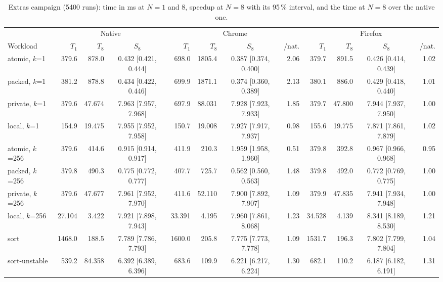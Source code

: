 \begin{table}[htbp]
\caption{Extras campaign (5400 runs): time in ms at $N=1$ and 8, speedup at $N=8$ with its 95\,\% interval, and the time at $N=8$ over the native one.}\label{tab:extras}
\centering\scriptsize
\begin{tabular}{lrrcrrcrrrcr}
\toprule
 & \multicolumn{3}{c}{Native} & \multicolumn{4}{c}{Chrome} & \multicolumn{4}{c}{Firefox} \\
Workload & $T_1$ & $T_8$ & $S_8$ & $T_1$ & $T_8$ & $S_8$ & /nat. & $T_1$ & $T_8$ & $S_8$ & /nat. \\
\midrule
atomic, $k$=1 & 379.6 & 878.0 & 0.432 [0.421, 0.444] & 698.0 & 1805.4 & 0.387 [0.374, 0.400] & 2.06 & 379.7 & 891.5 & 0.426 [0.414, 0.439] & 1.02 \\
packed, $k$=1 & 381.2 & 878.8 & 0.434 [0.422, 0.446] & 699.9 & 1871.1 & 0.374 [0.360, 0.389] & 2.13 & 380.1 & 886.0 & 0.429 [0.418, 0.440] & 1.01 \\
private, $k$=1 & 379.6 & 47.674 & 7.963 [7.957, 7.968] & 697.9 & 88.031 & 7.928 [7.923, 7.933] & 1.85 & 379.7 & 47.800 & 7.944 [7.937, 7.950] & 1.00 \\
local, $k$=1 & 154.9 & 19.475 & 7.955 [7.952, 7.958] & 150.7 & 19.008 & 7.927 [7.917, 7.937] & 0.98 & 155.6 & 19.775 & 7.871 [7.861, 7.879] & 1.02 \\
\midrule
atomic, $k$=256 & 379.6 & 414.6 & 0.915 [0.914, 0.917] & 411.9 & 210.3 & 1.959 [1.958, 1.960] & 0.51 & 379.8 & 392.8 & 0.967 [0.966, 0.968] & 0.95 \\
packed, $k$=256 & 379.8 & 490.3 & 0.775 [0.772, 0.777] & 407.7 & 725.7 & 0.562 [0.560, 0.563] & 1.48 & 379.8 & 492.0 & 0.772 [0.769, 0.775] & 1.00 \\
private, $k$=256 & 379.6 & 47.677 & 7.961 [7.952, 7.970] & 411.6 & 52.110 & 7.900 [7.892, 7.907] & 1.09 & 379.9 & 47.835 & 7.941 [7.934, 7.948] & 1.00 \\
local, $k$=256 & 27.104 & 3.422 & 7.921 [7.898, 7.943] & 33.391 & 4.195 & 7.960 [7.861, 8.068] & 1.23 & 34.528 & 4.139 & 8.341 [8.189, 8.530] & 1.21 \\
\midrule
sort & 1468.0 & 188.5 & 7.789 [7.786, 7.793] & 1600.0 & 205.8 & 7.775 [7.773, 7.778] & 1.09 & 1531.7 & 196.3 & 7.802 [7.799, 7.804] & 1.04 \\
sort-unstable & 539.2 & 84.358 & 6.392 [6.389, 6.396] & 683.6 & 109.9 & 6.221 [6.217, 6.224] & 1.30 & 682.1 & 110.2 & 6.187 [6.182, 6.191] & 1.31 \\
\bottomrule
\end{tabular}
\end{table}
